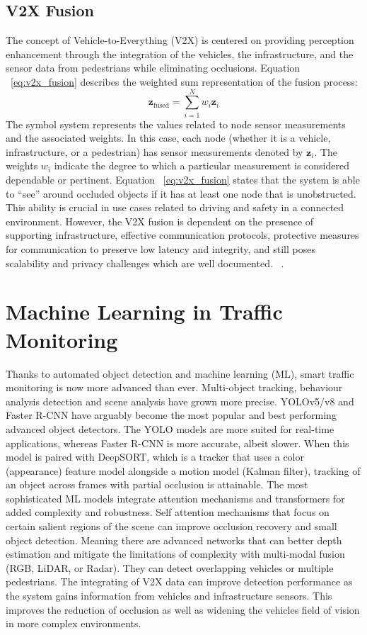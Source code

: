 \documentclass[12pt,a4paper]{report}
\theoremstyle{definition}
\theoremstyle{remark}
\begin{document}
\subsection{V2X Fusion}
The concept of Vehicle-to-Everything (V2X) is centered on providing perception enhancement through the integration of the vehicles, the infrastructure, and the sensor data from pedestrians while eliminating occlusions. Equation ~\ref{eq:v2x_fusion} describes the weighted sum representation of the fusion process:
\begin{equation}
\label{eq:v2x_fusion}
\mathbf{z}_{\text{fused}} = \sum_{i=1}^N w_i \mathbf{z}_i
\end{equation}
The symbol system represents the values related to node sensor measurements and the associated weights. In this case, each node (whether it is a vehicle, infrastructure, or a pedestrian) has sensor measurements denoted by $\mathbf{z}_i$. The weights $w_i$ indicate the degree to which a particular measurement is considered dependable or pertinent. Equation ~\ref{eq:v2x_fusion} states that the system is able to “see” around occluded objects if it has at least one node that is unobstructed. This ability is crucial in use cases related to driving and safety in a connected environment. However, the V2X fusion is dependent on the presence of supporting infrastructure, effective communication protocols, protective measures for communication to preserve low latency and integrity, and still poses scalability and privacy challenges which are well documented. ~\cite{paper51}.

\section{Machine Learning in Traffic Monitoring}
Thanks to automated object detection and machine learning (ML), smart traffic monitoring is now more advanced than ever. Multi-object tracking, behaviour analysis detection and scene analysis have grown more precise. YOLOv5/v8 and Faster R-CNN have arguably become the most popular and best performing advanced object detectors. The YOLO models are more suited for real-time applications, whereas Faster R-CNN is more accurate, albeit slower. When this model is paired with DeepSORT, which is a tracker that uses a color (appearance) feature model alongside a motion model (Kalman filter), tracking of an object across frames with partial occlusion is attainable. The most sophisticated ML models integrate attention mechanisms and transformers for added complexity and robustness. Self attention mechanisms that focus on certain salient regions of the scene can improve occlusion recovery and small object detection. Meaning there are advanced networks that can better depth estimation and mitigate the limitations of complexity with multi-modal fusion (RGB, LiDAR, or Radar). They can detect overlapping vehicles or multiple pedestrians. The integrating of V2X data can improve detection performance as the system gains information from vehicles and infrastructure sensors. This improves the reduction of occlusion as well as widening the vehicles field of vision in more complex environments.
\end{document}
